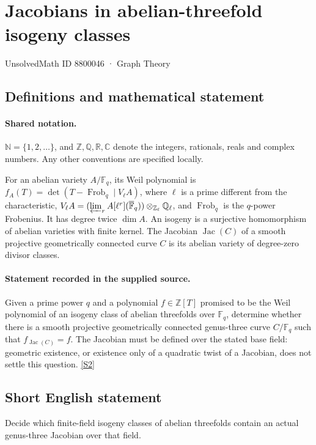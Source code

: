 \documentclass[11pt]{article}
\newcommand{\sref}[2]{\hyperlink{source:#1:#2}{[S#2]}}
\begin{document}
\setcounter{section}{8800045}
\section{Jacobians in abelian-threefold isogeny classes}\label{8800046}
{\small\sffamily UnsolvedMath ID 8800046 · Graph Theory}
\subsection{Definitions and mathematical statement}

\paragraph{Shared notation.}$\mathbb N=\{1,2,\ldots\}$, and $\mathbb Z,\mathbb Q,\mathbb R,\mathbb C$ denote the integers, rationals, reals and complex numbers. Any other conventions are specified locally.


For an abelian variety $A/\mathbb F_q$, its Weil polynomial is $f_A(T)=\det(T-\operatorname{Frob}_q\mid V_\ell A)$, where $\ell$ is a prime different from the characteristic, $V_\ell A=(\varprojlim_r A[\ell^r](\overline{\mathbb F}_q))\otimes_{\mathbb Z_\ell}\mathbb Q_\ell$, and $\operatorname{Frob}_q$ is the $q$-power Frobenius. It has degree twice $\dim A$. An isogeny is a surjective homomorphism of abelian varieties with finite kernel. The Jacobian $\operatorname{Jac}(C)$ of a smooth projective geometrically connected curve $C$ is its abelian variety of degree-zero divisor classes.
\paragraph{Statement recorded in the supplied source.}
Given a prime power $q$ and a polynomial $f\in\mathbb Z[T]$ promised to be the Weil polynomial of an isogeny class of abelian threefolds over $\mathbb F_q$, determine whether there is a smooth projective geometrically connected genus-three curve $C/\mathbb F_q$ such that $f_{\operatorname{Jac}(C)}=f$. The Jacobian must be defined over the stated base field: geometric existence, or existence only of a quadratic twist of a Jacobian, does not settle this question. \sref{8800046}{2}

\subsection{Short English statement}
Decide which finite-field isogeny classes of abelian threefolds contain an actual genus-three Jacobian over that field.
\end{document}

